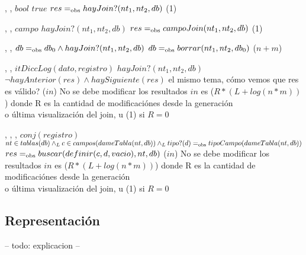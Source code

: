 {   ,
    ,
    }
{$bool$}
{$true$}
{$res =_{\mathrm{obs}} hayJoin?(nt_1,nt_2,db)$}
{\bigo(1)}
{}
{}

{   ,
    ,
    }
{$campo$}
{$hayJoin?(nt_1,nt_2,db)$}
{$res =_{\mathrm{obs}} campoJoin(nt_1,nt_2,db)$}
{\bigo(1)}
{}
{}

{   ,
    ,
    }
{}
{$db =_{\mathrm{obs}} db_0 \land hayJoin?(nt_1,nt_2,db)$}
{$db =_{\mathrm{obs}} borrar(nt_1,nt_2,db_0)$}
{\bigo($n + m$)}
{}
{}

{   ,
    ,
    }
{$itDiccLog(dato,registro)$}
{$hayJoin?(nt_1,nt_2,db)$}
{$\neg hayAnterior(res) \land haySiguiente(res)$ \cuidado el mismo tema, cómo vemos que res es válido?}
{\bigo($in$)}
{No se debe modificar los resultados}
{$in$ es \bigo($R * (L + log(n * m))$) donde R es la cantidad de modificaciónes desde la generación \\
    \hspace*{4em} o última visualización del join, u \bigo(1) si $R = 0$}

{   ,
    ,
    ,
    }
{$conj(registro)$}
{$nt \in tablas(db) \land_L c \in campos(dameTabla(nt,db)) \land_L tipo?(d) =_{\mathrm{obs}} tipoCampo(dameTabla(nt,db))$}
{$res =_{\mathrm{obs}} buscar(definir(c,d,vacio), nt, db)$}
{\bigo($in$)}
{No se debe modificar los resultados}
{$in$ es \bigo($R * (L + log(n * m))$) donde R es la cantidad de modificaciónes desde la generación \\
    \hspace*{4em} o última visualización del join, u \bigo(1) si $R = 0$}

\subsection{Representación}

-- todo: explicacion --


